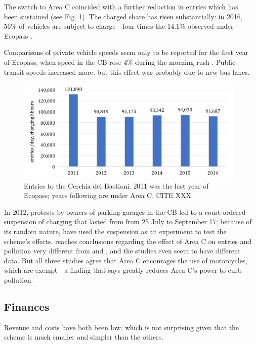 The switch to Area C coincided with a further reduction in entries which has been sustained (see Fig. \ref{fig:milan-entries}). The charged share has risen substantially: in 2016, 56\% of vehicles are subject to charge---four times the 14.1\% observed under Ecopass \citep[p. 13]{AMAT2017}.

Comparisons of private vehicle speeds seem only to be reported for the first year of Ecopass, when speed in the CB rose 4\% during the morning rush \citep{AMMA2009}. Public transit speeds increased more, but this effect was probably due to new bus lanes.

\begin{figure}[ht]
	\includegraphics[width=\textwidth]{../img/milan-entries2.png}
	\caption{Entries to the Cerchia dei Bastioni. 2011 was the last year of Ecopass; years following are under Area C. CITE XXX}
	\label{fig:milan-entries}
\end{figure}

In 2012, protests by owners of parking garages in the CB led to a court-ordered suspension of charging that lasted from from 25 July to September 17; because of its random nature, have used the suspension as an experiment to test the scheme's effects. \citet{Gibson2015} reaches conclusions regarding the effect of Area C on entries and pollution very different from \citet{Percoco2013} and \citet{Percoco2014}, and the studies even seem to have different data. But all three studies agree that Area C encourages the use of motorcycles, which are exempt---a finding that \citet{Percoco2013} says greatly reduces Area C's power to curb pollution.

\subsection{Finances}

Revenue and costs have both been low, which is not surprising given that the scheme is much smaller and simpler than the others.

